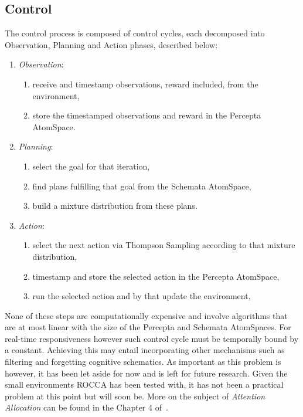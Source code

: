 \documentclass[runningheads]{llncs}
\begin{document}
\subsection{Control}
The control process is composed of control cycles, each decomposed
into Observation, Planning and Action phases, described below:
\begin{enumerate}
\item \emph{Observation}:
  \begin{enumerate}
  \item receive and timestamp observations, reward included, from the
    environment,
  \item store the timestamped observations and reward in the Percepta
    AtomSpace.
  \end{enumerate}
\item \emph{Planning}:
  \begin{enumerate}
  \item select the goal for that iteration,
  \item find plans fulfilling that goal from the Schemata AtomSpace,
  \item build a mixture distribution from these plans.
  \end{enumerate}
\item \emph{Action}:
  \begin{enumerate}
  \item select the next action via Thompson Sampling according to that
    mixture distribution,
  \item timestamp and store the selected action in the Percepta
    AtomSpace,
  \item run the selected action and by that update the environment,
  \end{enumerate}
\end{enumerate}
None of these steps are computationally expensive and involve
algorithms that are at most linear with the size of the Percepta and
Schemata AtomSpaces.  For real-time responsiveness however such
control cycle must be temporally bound by a constant.  Achieving this
may entail incorporating other mechanisms such as filtering and
forgetting cognitive schematics.  As important as this problem is
however, it has been let aside for now and is left for future
research.  Given the small environments ROCCA has been tested with, it
has not been a practical problem at this point but will soon be.  More
on the subject of \emph{Attention Allocation} can be found in the
Chapter 4 of~\cite{Goertzel2014EGI2}.
\end{document}
